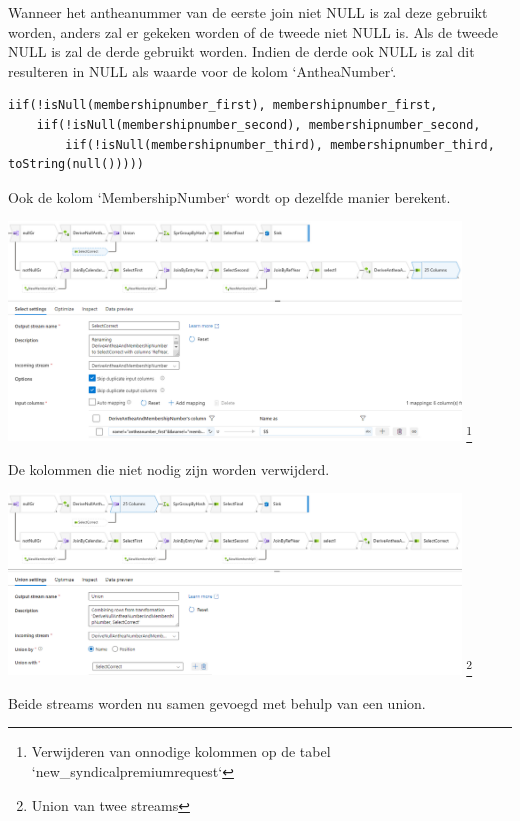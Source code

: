 Wanneer het antheanummer van de eerste join niet NULL is zal deze gebruikt worden, anders zal er gekeken worden of de tweede niet NULL is. Als de tweede NULL is zal de derde gebruikt worden. Indien de derde ook NULL is zal dit resulteren in NULL als waarde voor de kolom `AntheaNumber`.

\begin{verbatim}
iif(!isNull(membershipnumber_first), membershipnumber_first, 
    iif(!isNull(membershipnumber_second), membershipnumber_second,         
        iif(!isNull(membershipnumber_third), membershipnumber_third, toString(null()))))
\end{verbatim}

Ook de kolom `MembershipNumber` wordt op dezelfde manier berekent.

\begin{center}
    \includegraphics[width=0.9\textwidth]{./graphics/adf/member_8.png}
    \footnote{Verwijderen van onnodige kolommen op de tabel `new\_syndicalpremiumrequest`}
\end{center}

De kolommen die niet nodig zijn worden verwijderd.

\begin{center}
    \includegraphics[width=0.9\textwidth]{./graphics/adf/member_9.png}
    \footnote{Union van twee streams}
\end{center}

Beide streams worden nu samen gevoegd met behulp van een union.


